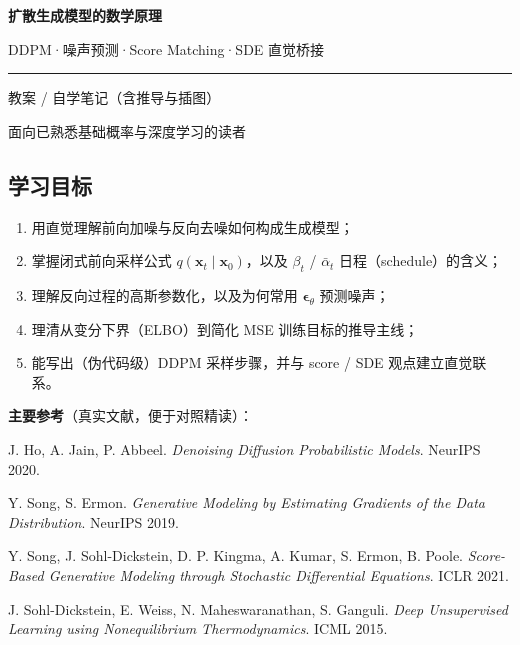 \documentclass[a4paper,fontset=none,zihao=5]{ctexart}
\numberwithin{equation}{section}
\newcommand{\x}{\mathbf{x}}
\newcommand{\abar}{\bar{\alpha}}
\newcommand{\epst}{\boldsymbol{\epsilon}_\theta}
\begin{document}
\thispagestyle{plain}
\begin{center}
  \vspace*{1.2cm}
  {\sffamily\bfseries\fontsize{24}{32}\selectfont\color{ctitle} 扩散生成模型的数学原理\par}
  \vspace{0.6em}
  {\large\color{csub} DDPM\enspace·\enspace 噪声预测\enspace·\enspace Score Matching\enspace·\enspace SDE 直觉桥接\par}
  \vspace{0.5em}
  {\color{chead}\rule{0.6\textwidth}{1.5pt}\par}
  \vspace{0.5em}
  {\color{csub} 教案 / 自学笔记（含推导与插图）\par}
  {\color{csub} 面向已熟悉基础概率与深度学习的读者\par}
\end{center}
\vspace{0.8cm}

\subsection*{学习目标}
\begin{enumerate}[leftmargin=2.2em,itemsep=2pt]
  \item 用直觉理解前向加噪与反向去噪如何构成生成模型；
  \item 掌握闭式前向采样公式 $q(\x_t\mid\x_0)$，以及 $\beta_t$ / $\abar_t$ 日程（schedule）的含义；
  \item 理解反向过程的高斯参数化，以及为何常用 $\epst$ 预测噪声；
  \item 理清从变分下界（ELBO）到简化 MSE 训练目标的推导主线；
  \item 能写出（伪代码级）DDPM 采样步骤，并与 score / SDE 观点建立直觉联系。
\end{enumerate}

\vspace{0.4cm}
\noindent\textbf{主要参考}（真实文献，便于对照精读）：
\begin{enumerate}[label={[\arabic*]},leftmargin=2.2em,itemsep=1pt,font=\small]\small
  \item J. Ho, A. Jain, P. Abbeel. \emph{Denoising Diffusion Probabilistic Models}. NeurIPS 2020.
  \item Y. Song, S. Ermon. \emph{Generative Modeling by Estimating Gradients of the Data Distribution}. NeurIPS 2019.
  \item Y. Song, J. Sohl-Dickstein, D. P. Kingma, A. Kumar, S. Ermon, B. Poole. \emph{Score-Based Generative Modeling through Stochastic Differential Equations}. ICLR 2021.
  \item J. Sohl-Dickstein, E. Weiss, N. Maheswaranathan, S. Ganguli. \emph{Deep Unsupervised Learning using Nonequilibrium Thermodynamics}. ICML 2015.
\end{enumerate}
\end{document}
